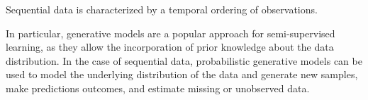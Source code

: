 \documentclass{article}
\def\x{{\mathbf x}}
\def\z{{\mathbf z}}
\def\y{{\mathbf y}}
\def\p{p_{\theta}}
\newcommand{\katy}[1]{\todo[inline,color=pink]{#1 --- Katy}}
\begin{document}

Sequential data is characterized by a temporal ordering of observations. 




In particular, generative models are a popular approach for semi-supervised learning, 
as they allow the incorporation of prior knowledge about the data distribution.
In the case of sequential data, probabilistic generative models can be used to
model the underlying distribution of the data and generate new samples,
make predictions outcomes, and estimate missing or unobserved data. 








\end{document}
